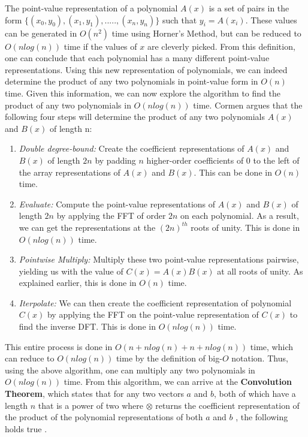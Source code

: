 \documentclass{amsproc}
\begin{document}
The point-value representation of a polynomial $A(x)$ is a set of pairs in the form ${\{(x_0, y_0), (x_1, y_1), ..... , (x_n, y_n)\}}$ such that $y_i = A(x_i)$.  These values can be generated in $O(n^2)$  time using Horner's Method, but can be reduced to $O(nlog(n))$ time if the values of $x$ are cleverly picked. From this definition, one can conclude that each polynomial has a many different point-value representations. Using this new representation of polynomials, we can indeed determine the product of any two polynomials in point-value form in $O(n)$ time. Given this information, we can now explore the algorithm to find the product of any two polynomials in $O(nlog(n))$ time. Cormen argues that the following four steps will determine the product of any two polynomials $A(x)$ and $B(x)$ of length n:

\begin{enumerate}
	\item \textit{Double degree-bound: } Create the coefficient representations of $A(x)$ and $B(x)$ of length $2n$ by padding $n$ higher-order coefficients of 0 to the left of the array representations of $A(x)$ and $B(x)$. This can be done in $O(n)$ time.
	\item \textit{Evaluate: } Compute the point-value representations of $A(x)$ and $B(x)$ of length $2n$ by applying the FFT of order $2n$ on each polynomial. As a result, we can get the representations at the $(2n)^{th}$ roots of unity. This is done in $O(nlog(n))$ time.
	\item \textit{Pointwise Multiply: } Multiply these two point-value representations pairwise, yielding us with the value of $C(x) = A(x)B(x)$ at all roots of unity. As explained earlier, this is done in $O(n)$ time.
	\item \textit{Iterpolate: } We can then create the coefficient representation of polynomial  $C(x)$ by applying the FFT on the point-value representation of $C(x)$ to find the inverse DFT. This is done in $O(nlog(n))$ time.

\end{enumerate}

This entire process is done in $O(n + nlog(n) + n + nlog(n))$ time, which can reduce to $O(nlog(n))$ time by the definition of big-$O$ notation. Thus, using the above algorithm, one can multiply any two polynomials in $O(nlog(n))$ time.  From this algorithm, we can arrive at the \textbf{Convolution Theorem}, which states that for any two vectors $a$ and $b$, both of which have a length $n$ that is a power of two where $\otimes$ returns the coefficient representation of the product of the polynomial representations of both $a$ and $b$ , the following holds true \cite{Cormen}.
\end{document}
